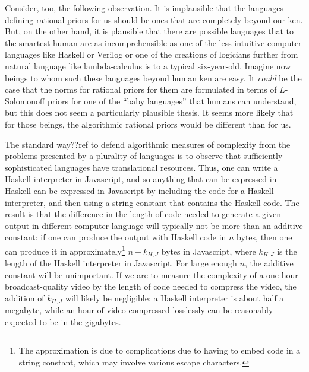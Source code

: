 Consider, too, the following observation. It is implausible that the languages defining rational priors for us
should be ones that are completely beyond our ken. But, on the other hand, it is plausible that there are possible
languages that to the smartest human are as incomprehensible as one of the less intuitive computer languages like
Haskell or Verilog or one of the creations of logicians further from natural language like lambda-calculus is to a typical
six-year-old. Imagine now beings to whom such these languages beyond human ken are easy. It \textit{could} be the case that
the norms for rational priors for them are formulated in terms of $L$-Solomonoff priors for one of the ``baby languages''
that humans can understand, but this does not seem a particularly plausible thesis. It seems more likely that for those
beings, the algorithmic rational priors would be different than for us. 

The standard way??ref to defend algorithmic measures of complexity from the problems presented by a plurality of languages
is to observe that sufficiently sophisticated languages have translational resources. Thus, one can write a Haskell interpreter
in Javascript, and so anything that can be expressed in Haskell can be expressed in Javascript by including the code for a Haskell interpreter, 
and then using a string constant that contains the Haskell code. The result is that the difference in the length of code needed to
generate a given output in different computer language will typically not be more than an additive constant: if one can
produce the output with Haskell code in $n$ bytes, then one can produce it in approximately\footnote{The approximation is due
to complications due to having to embed code in a string constant, which may involve various escape characters.} $n+k_{H,J}$ 
bytes in Javascript, where $k_{H,J}$ is the length of the Haskell interpreter in Javascript. For large enough $n$, the additive constant will be
unimportant. If we are to measure the complexity of a one-hour broadcast-quality video by the length of code needed to compress 
the  video, the addition of $k_{H,J}$ will likely be negligible: a Haskell interpreter is about half a megabyte, while 
an hour of video compressed losslessly can be reasonably expected to be in the gigabytes.

